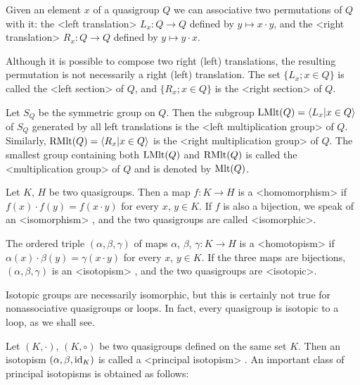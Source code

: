 Given an element $x$ of a quasigroup $Q$ we can associative two permutations of
$Q$ with it: the <left translation>
%
%
 $L_x:Q\to Q$ defined by $y\mapsto
x\cdot y$, and the <right translation>
%
%
 $R_x:Q\to Q$ defined by $y\mapsto
y\cdot x$.

Although it is possible to compose two right (left) translations, the resulting
permutation is not necessarily a right (left) translation. The set $\{L_x;x\in
Q\}$ is called the <left section>
%
%
 of $Q$, and $\{R_x;x\in Q\}$ is the
<right section>
%
%
 of $Q$.

Let $S_Q$ be the symmetric group on $Q$. Then the subgroup ${\rm{LMlt}}(Q)=\langle
L_x|x\in Q\rangle$ of $S_Q$ generated by all left translations is the
<left multiplication group>
%
%
 of $Q$. Similarly, ${\rm{RMlt}}(Q)= \langle R_x|x\in
Q\rangle$ is the <right multiplication group>
%
%
 of $Q$. The smallest group containing both ${\rm{LMlt}}(Q)$ and
${\rm{RMlt}}(Q)$ is called the <multiplication group>
%
%
 of $Q$ and is denoted by ${\rm{Mlt}}(Q)$.


Let $K$, $H$ be two quasigroups. Then a map $f:K\to H$ is a <homomorphism>
%
%
 if $f(x)\cdot f(y)=f(x\cdot y)$ for every $x$, $y\in K$. If
$f$ is also a bijection, we speak of an <isomorphism>
%
%
, and the two quasigroups are called <isomorphic>.

The ordered triple $(\alpha,\beta,\gamma)$ of maps $\alpha$, $\beta$,
$\gamma:K\to H$ is a <homotopism>
%
%
 if $\alpha(x)\cdot\beta(y) =
\gamma(x\cdot y)$ for every $x$, $y\in K$. If the three maps are bijections,
$(\alpha,\beta,\gamma)$ is an <isotopism>
%
%
, and the two quasigroups are
<isotopic>.

Isotopic groups are necessarily isomorphic, but this is certainly not true for
nonassociative quasigroups or loops. In fact, every quasigroup is isotopic to a
loop, as we shall see.

Let $(K,\cdot)$, $(K,\circ)$ be two quasigroups defined on the same set $K$.
Then an isotopism $(\alpha,\beta,{\rm{id}}_K)$ is called a <principal isotopism>
%
%
. An important class of principal isotopisms is obtained as follows:


